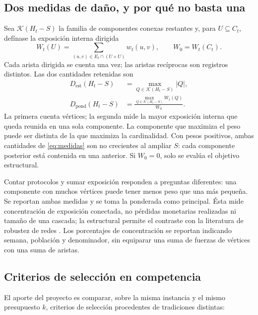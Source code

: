 \documentclass[journal]{IEEEtran}
\begin{document}
\subsection{Dos medidas de daño, y por qué no basta una}

Sea $\mathcal K(H_t-S)$ la familia de componentes conexas restantes y, para
$U\subseteq C_t$, defínase la exposición interna dirigida
\begin{equation}
W_t(U)=\sum_{(u,v)\in E_t\cap(U\times U)}w_t(u,v),
\qquad W_0=W_t(C_t).
\label{eq:peso-interno}
\end{equation}
Cada arista dirigida se cuenta una vez; las aristas recíprocas son registros
distintos. Las dos cantidades retenidas son
\begin{equation}
\begin{aligned}
D_{\mathrm{est}}(H_t-S)&=\max_{Q\in\mathcal K(H_t-S)}|Q|,\\
D_{\mathrm{pond}}(H_t-S)&=\frac{\max_{Q\in\mathcal K(H_t-S)}W_t(Q)}{W_0}.
\end{aligned}
\label{eq:medidas}
\end{equation}
La primera cuenta vértices; la segunda mide la mayor exposición interna que
queda reunida en una sola componente. La componente que maximiza el peso puede
ser distinta de la que maximiza la cardinalidad.
Con pesos positivos, ambas cantidades de \eqref{eq:medidas} son no crecientes
al ampliar $S$: cada componente posterior está contenida en una anterior.
Si $W_0=0$, solo se evalúa el objetivo estructural.

Contar protocolos y sumar exposición responden a preguntas diferentes: una
componente con muchos vértices puede tener menos peso que una más pequeña.
Se reportan ambas medidas y se toma la ponderada como principal. Ésta mide
concentración de exposición conectada, no pérdidas monetarias realizadas ni
tamaño de una cascada; la estructural permite el contraste con la literatura
de robustez de redes \cite{albert2000error}. Los porcentajes de concentración
se reportan indicando semana, población y denominador, sin equiparar una suma
de fuerzas de vértices con una suma de aristas.

\subsection{Criterios de selección en competencia}

El aporte del proyecto es comparar, sobre la misma instancia y el mismo
presupuesto $k$, criterios de selección procedentes de tradiciones distintas:
\end{document}
